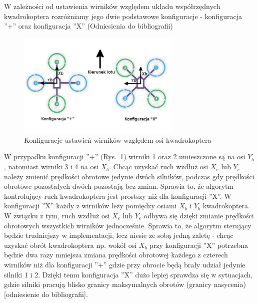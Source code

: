 W zależności od ustawienia wirników względem układu współrzędnych kwadrokoptera rozróżniamy jego dwie podstawowe konfiguracje - konfiguracja ''+''  oraz konfiguracja ''X'' (Odniesienia do bibliografii)

\begin{figure}[htbp]
	\centering
		\includegraphics[width=0.7\textwidth]{Pictures/quadrotor_configurations.png}
	\caption[Konfiguracje kwadrokopterów]{Konfiguracje ustawień wirników względem osi kwadrokoptera}
	\label{fig:quadrotor_configurations.png}
\end{figure}

W przypadku konfiguracji ''+'' (Rys.~\ref{fig:quadrotor_configurations.png}) wirniki 1 oraz 2 umieszczone są na osi $Y_b$, natomiast wirniki 3 i 4 na osi $X_b $. Chcąc uzyskać ruch wzdłuż osi $X_e$ lub $Y_e$ należy zmienić prędkości obrotowe jedynie dwóch silników, podczas gdy prędkości obrotowe pozostałych dwóch pozostają bez zmian. Sprawia to, że algorytm kontrolujący ruch kwadrokoptera jest prostszy niż dla konfiguracji ''X''. W konfiguracji ''X'' każdy z wirników leży pomiędzy osiami $X_b$ i $Y_b$ kwadrokoptera. W związku z tym, ruch wzdłuż osi $X_e$ lub $Y_e$ odbywa się dzięki zmianie prędkości obrotowych wszystkich wirników jednocześnie. Sprawia to, że algorytm sterujący będzie trudniejszy w implementacji, lecz niesie ze sobą jedną zaletę - chcąc uzyskać obrót kwadrokoptera np. wokół osi $X_b$ przy konfiguracji ''X'' potrzebna będzie dwa razy mniejsza zmiana prędkości obrotowej każdego z czterech wirników niż dla konfiguracji ''+'' gdzie przy obrocie będą brały udział jedynie silniki 1 i 2. Dzięki temu konfiguracja ''X'' dużo lepiej sprawdza się w sytuacjach, gdzie silniki pracują blisko granicy maksymalnych obrotów (granicy nasycenia) [odniesienie do bibliografii].

